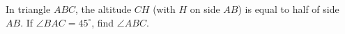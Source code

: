 In triangle $ABC$, the altitude $CH$ (with $H$ on side $AB$) is equal to half of side $AB$. If $\angle BAC=45^\circ$, find $\angle ABC$.
